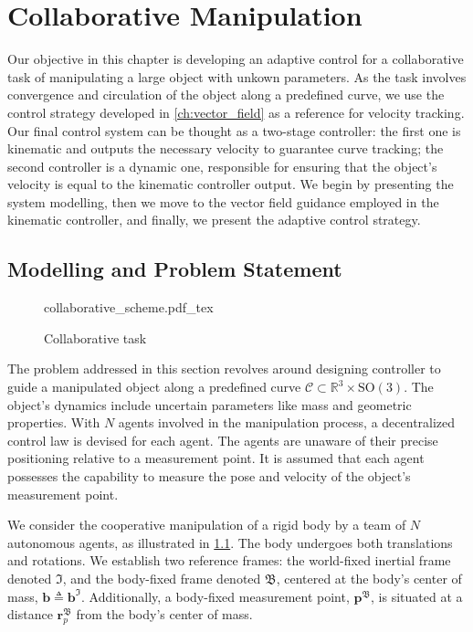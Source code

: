 \chapter{Collaborative Manipulation}\label{ch:collaborative}
Our objective in this chapter is developing an adaptive control for a collaborative task of manipulating a large object with unkown parameters. As the task involves convergence and circulation of the object along a predefined curve, we use the control strategy developed in \cref{ch:vector_field} as a reference for velocity tracking. Our final control system can be thought as a two-stage controller: the first one is kinematic and outputs the necessary velocity to guarantee curve tracking; the second controller is a dynamic one, responsible for ensuring that the object's velocity is equal to the kinematic controller output. We begin by presenting the system modelling, then we move to the vector field guidance employed in the kinematic controller, and finally, we present the adaptive control strategy.
\section{Modelling and Problem Statement} \label{sec:dynamic-modelling}
\begin{figure}[ht]
    \centering
    \def\svgwidth{.8\linewidth}
    {collaborative_scheme.pdf_tex}
    \caption{Collaborative task}
    \label{fig:problem}
\end{figure}
The problem addressed in this section revolves around designing controller to guide a manipulated object along a predefined curve $\mathcal{C} \subset \mathbb{R}^3\times \text{SO}(3)$. The object's dynamics include uncertain parameters like mass and geometric properties. With $N$ agents involved in the manipulation process, a decentralized control law is devised for each agent. The agents are unaware of their precise positioning relative to a measurement point. It is assumed that each agent possesses the capability to measure the pose and velocity of the object's measurement point.

We consider the cooperative manipulation of a rigid body by a team of $N$ autonomous agents, as illustrated in \cref{fig:problem}. The body undergoes both translations and rotations. We establish two reference frames: the world-fixed inertial frame denoted $\mathfrak{I}$, and the body-fixed frame denoted $\mathfrak{B}$, centered at the body's center of mass, $\mathbf{b}\triangleq\mathbf{b}^\mathfrak{I}$. Additionally, a body-fixed measurement point, $\mathbf{p}^\mathfrak{B}$, is situated at a distance $\mathbf{r}_p^\mathfrak{B}$ from the body's center of mass.

